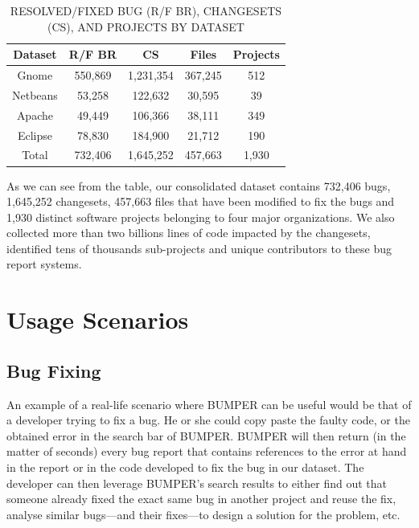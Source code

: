 \documentclass[conference]{IEEEtran}
\begin{document}
\begin{table}[]
\centering
\caption{
RESOLVED/FIXED BUG (R/F BR),  CHANGESETS (CS), AND
PROJECTS BY DATASET}
\label{tab:summary}
\begin{tabular}{c|c|c|c|c}
\textbf{Dataset} & \textbf{R/F BR} & \textbf{CS} & \textbf{Files} & \textbf{Projects} \\ \hline \hline
Gnome            & 550,869         & 1,231,354   & 367,245        & 512                \\ \hline
Netbeans         & 53,258          & 122,632     & 30,595         & 39                \\ \hline
Apache           & 49,449          & 106,366     & 38,111         & 349               \\ \hline
Eclipse          & 78,830          & 184,900     & 21,712         & 190                \\ \hline \hline
Total            & 732,406         & 1,645,252   & 457,663        & 1,930               \\ \hline \hline
\end{tabular}
\vspace{-2.5em}
\end{table}

As we can see from the table, our consolidated dataset contains 732,406 bugs, 1,645,252 changesets, 457,663 files that have been modified to fix the bugs and 1,930 distinct software projects belonging to four major organizations.
We also collected more than two billions lines of code impacted by the changesets, identified tens of thousands sub-projects and unique contributors to these bug report systems.


\section{Usage Scenarios}

\subsection{Bug Fixing}
\label{subs:Bug Fixing}


An example of a real-life scenario where BUMPER can be useful would be that of a developer trying to fix a bug. He or she could copy paste the faulty code, or the obtained error in the search bar of BUMPER. BUMPER will then return (in the matter of seconds) every bug report that contains references to the error at hand in the report or in the code developed to fix the bug in our dataset. The developer can then leverage BUMPER’s search results to either find out that someone already fixed the exact same bug in another project and reuse the fix, analyse similar bugs—and their fixes—to design a solution for the problem, etc.
\end{document}

